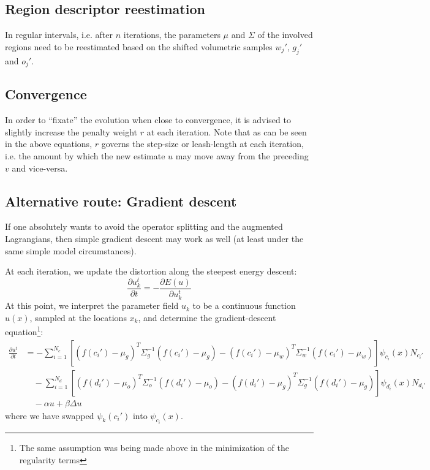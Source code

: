 \subsection{Region descriptor reestimation}
In regular intervals, i.e. after $n$ iterations, the parameters $\mu$ and $\Sigma$ of the involved regions need to be reestimated based on the shifted volumetric samples $w_j'$, $g_j'$ and $o_j'$.

\subsection{Convergence}
In order to ``fixate'' the evolution when close to convergence, it is advised to slightly increase the penalty weight $r$ at each iteration. Note that as can be seen in the above equations, $r$ governs the step-size or  leash-length at each iteration, i.e. the amount by which the new estimate $u$ may move away from the preceding $v$ and vice-versa. 


\subsection{Alternative route: Gradient descent}
If one absolutely wants to avoid the operator splitting and the augmented Lagrangians, then simple gradient descent may work as well (at least under the same simple model circumstances).

At each iteration, we update the distortion along the steepest energy descent:
\begin{equation}
\frac{\partial u_k^t}{\partial t} = -\frac{\partial E(u)}{\partial u_k^t}
\end{equation}
At this point, we interpret the parameter field $u_k$ to be a continuous function $u(x)$, sampled at the locations $x_k$, and determine the gradient-descent equation\footnote{The same assumption was being made above in the minimization of the regularity terms}:
\begin{align}
\frac{\partial u^t}{\partial t} &= - \sum_{i=1}^{N_c} \left[(f(c_i')-\mu_g)^T\Sigma_g^{-1}(f(c_i')-\mu_g) - (f(c_i')-\mu_w)^T\Sigma_w^{-1}(f(c_i')-\mu_w)\right]\psi_{c_i}(x)N_{c_i'}\nonumber\\
&\quad -\sum_{i=1}^{N_d} \left[(f(d_i')-\mu_o)^T\Sigma_o^{-1}(f(d_i')-\mu_o) - (f(d_i')-\mu_g)^T\Sigma_g^{-1}(f(d_i')-\mu_g)\right]\psi_{d_i}(x)N_{d_i'}\\
&\quad -\alpha u + \beta\Delta u\nonumber
\end{align}
where we have swapped $\psi_k(c_i')$ into $\psi_{c_i}(x)$.


